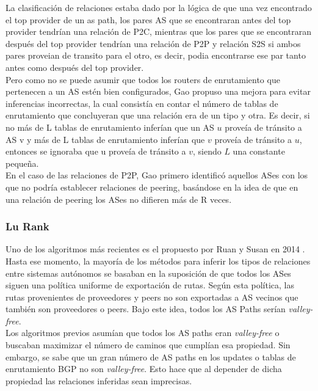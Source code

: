 La clasificación de relaciones estaba dado por la lógica de que una vez encontrado el top provider de un as path, los pares AS que se encontraran antes del top provider tendrían una relación de P2C, mientras que los pares que se encontraran después del top provider tendrían una relación de P2P y relación S2S si ambos pares proveian de transito para el otro, es decir, podia encontrarse ese par tanto antes como después del top provider.\\

Pero como no se puede asumir que todos los routers de enrutamiento que pertenecen a un AS estén bien configurados, Gao propuso una mejora para evitar inferencias incorrectas, la cual consistía en contar el número de tablas de enrutamiento que concluyeran que una relación era de un tipo y otra. Es decir, si no más de L tablas de enrutamiento inferían que un AS $u$ proveía de tránsito a AS v y más de L tablas de enrutamiento inferían que $v$ proveía de tránsito a $u$, entonces se ignoraba que u proveía de tránsito a $v$, siendo $L$ una constante pequeña.\\

En el caso de las relaciones de P2P, Gao primero identificó aquellos ASes con los que no podría establecer relaciones de peering, basándose en la idea de que en una relación de peering los ASes no difieren más de R veces.\\



\subsubsection{Lu Rank} \label{sec:anexo_lurank}


Uno de los algoritmos más recientes es el propuesto por Ruan y Susan en 2014 \cite{computing-observed-autonomous-system-relationships-in-the-internet}. Hasta ese momento, la mayoría de los métodos para inferir los tipos de relaciones entre sistemas autónomos se basaban en la suposición de que todos los ASes siguen una política uniforme de exportación de rutas. Según esta política, las rutas provenientes de proveedores y peers no son exportadas a AS vecinos que también son proveedores o peers. Bajo este idea, todos los AS Paths serían \textit{valley-free}. \\

Los algoritmos previos asumían que todos los AS paths eran \textit{valley-free} o buscaban maximizar el número de caminos que cumplían esa propiedad. Sin embargo, se sabe que un gran número de AS paths en los updates  o tablas de enrutamiento BGP no son \textit{valley-free}. Esto hace que al depender de dicha propiedad las relaciones inferidas sean imprecisas.\\

